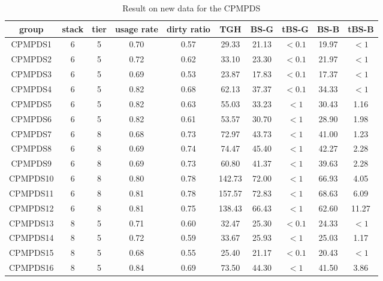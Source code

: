 \documentclass[review,3p,times,authoryear,12pt]{elsarticle}
\begin{document}
\begin{table}[!htb]

\caption{\label{tab:cpmpds} Result on new data for the CPMPDS}
\footnotesize
\centering
\begin{tabular}{c|c|c|c|c|c|c|c|c|c}

    \hline
    group & stack & tier  & usage rate & dirty ratio & TGH   & BS-G  & tBS-G & BS-B  & tBS-B \\
    \hline
    CPMPDS1 & 6      & 5     & 0.70  & 0.57  & 29.33   & 21.13  & $<0.1$  & 19.97  & $<1$ \\
    CPMPDS2 & 6      & 5     & 0.72  & 0.62  & 33.10   & 23.30  & $<0.1$  & 21.97  & $<1$ \\
    CPMPDS3 & 6      & 5     & 0.69  & 0.53  & 23.87   & 17.83  & $<0.1$  & 17.37  & $<1$\\
    CPMPDS4 & 6      & 5     & 0.82  & 0.68  & 62.13   & 37.37  & $<0.1$  & 34.33  & $<1$ \\
    CPMPDS5 & 6      & 5     & 0.82  & 0.63  & 55.03   & 33.23  & $<1$    & 30.43  & 1.16  \\
    CPMPDS6 & 6      & 5     & 0.82  & 0.61  & 53.57   & 30.70  & $<1$    & 28.90  & 1.98  \\
    CPMPDS7 & 6      & 8     & 0.68  & 0.73  & 72.97   & 43.73  & $<1$    & 41.00  & 1.23  \\
    CPMPDS8 & 6      & 8     & 0.69  & 0.74  & 74.47   & 45.40  & $<1$    & 42.27  & 2.28  \\
    CPMPDS9 & 6      & 8     & 0.69  & 0.73  & 60.80   & 41.37  & $<1$    & 39.63  & 2.28  \\
    CPMPDS10 & 6     & 8     & 0.80  & 0.78  & 142.73  & 72.00  & $<1$    & 66.93  & 4.05  \\
    CPMPDS11 & 6     & 8     & 0.81  & 0.78  & 157.57  & 72.83  & $<1$    & 68.63  & 6.09  \\
    CPMPDS12 & 6     & 8     & 0.81  & 0.75  & 138.43  & 66.43  & $<1$    & 62.60  & 11.27  \\
    CPMPDS13 & 8     & 5     & 0.71  & 0.60  & 32.47   & 25.30  & $<0.1$  & 24.33  & $<1$ \\
    CPMPDS14 & 8     & 5     & 0.72  & 0.59  & 33.67   & 25.93  & $<1$    & 25.03  & 1.17  \\
    CPMPDS15 & 8     & 5     & 0.68  & 0.55  & 25.40   & 21.17  & $<0.1$  & 20.43  & $<1$ \\
    CPMPDS16 & 8     & 5     & 0.84  & 0.69  & 73.50   & 44.30  & $<1$    & 41.50  & 3.86  \\

\end{tabular}
\end{table}
\end{document}
